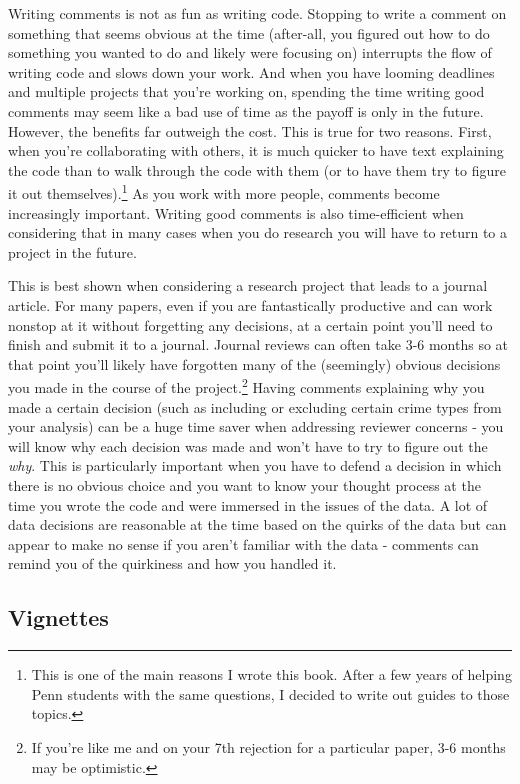 \documentclass[
  12pt,
]{book}
\begin{document}
Writing comments is not as fun as writing code. Stopping to write a comment on something that seems obvious at the time (after-all, you figured out how to do something you wanted to do and likely were focusing on) interrupts the flow of writing code and slows down your work. And when you have looming deadlines and multiple projects that you're working on, spending the time writing good comments may seem like a bad use of time as the payoff is only in the future. However, the benefits far outweigh the cost. This is true for two reasons. First, when you're collaborating with others, it is much quicker to have text explaining the code than to walk through the code with them (or to have them try to figure it out themselves).\footnote{This is one of the main reasons I wrote this book. After a few years of helping Penn students with the same questions, I decided to write out guides to those topics.} As you work with more people, comments become increasingly important. Writing good comments is also time-efficient when considering that in many cases when you do research you will have to return to a project in the future.

This is best shown when considering a research project that leads to a journal article. For many papers, even if you are fantastically productive and can work nonstop at it without forgetting any decisions, at a certain point you'll need to finish and submit it to a journal. Journal reviews can often take 3-6 months so at that point you'll likely have forgotten many of the (seemingly) obvious decisions you made in the course of the project.\footnote{If you're like me and on your 7th rejection for a particular paper, 3-6 months may be optimistic.} Having comments explaining why you made a certain decision (such as including or excluding certain crime types from your analysis) can be a huge time saver when addressing reviewer concerns - you will know why each decision was made and won't have to try to figure out the \emph{why}. This is particularly important when you have to defend a decision in which there is no obvious choice and you want to know your thought process at the time you wrote the code and were immersed in the issues of the data. A lot of data decisions are reasonable at the time based on the quirks of the data but can appear to make no sense if you aren't familiar with the data - comments can remind you of the quirkiness and how you handled it.

\hypertarget{vignettes}{%
\subsection{Vignettes}\label{vignettes}}
\end{document}
